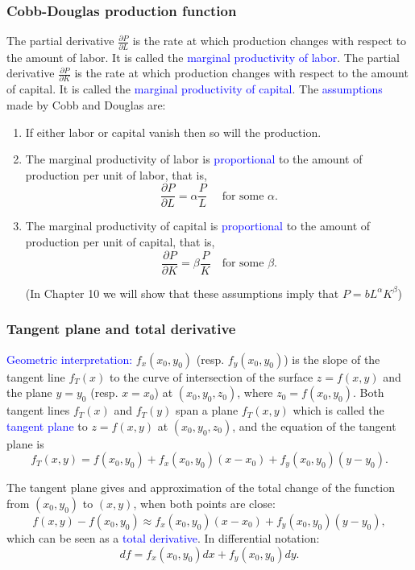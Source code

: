 \documentclass[11pt,aspectratio=169]{beamer}
\begin{document}
\begin{frame}
\frametitle{Cobb-Douglas production function}
\begin{small}
The partial derivative $\frac{\partial P}{\partial L}$ is the rate at  which production changes with respect to the amount of labor. It is called the \textcolor{blue}{marginal productivity of labor}.
 \vskip 10pt
 The partial derivative $\frac{\partial P}{\partial K}$ is the rate at  which production changes with respect to the amount of capital. It is called the \textcolor{blue}{marginal productivity of capital}.
 \vskip 10pt
 The \textcolor{blue}{assumptions}  made by Cobb and Douglas are:
 \begin{enumerate}
\item  If either labor or capital vanish then so will the  production.
\item The marginal productivity of labor is \textcolor{blue}{proportional} to the  amount  of production per unit of labor, that is,
$$
\frac{\partial P}{\partial L}=\alpha \frac{P}{L} \quad \text{ for some }  \alpha.
$$
\item The marginal productivity of capital is \textcolor{blue}{proportional} to the  amount  of production per unit of capital, that is,
$$
\frac{\partial P}{\partial K}=\beta \frac{P}{K}\quad \text{for some } \beta.
$$
\begin{tiny}(In Chapter 10 we will show that these assumptions imply that $P=b L^{\alpha} K^{\beta}$) \end{tiny}
 \end{enumerate}
 
\end{small}

\end{frame}

\begin{frame}
\frametitle{Tangent plane and total derivative}
\begin{small}
\textcolor{blue}{Geometric interpretation:} $f_x(x_0,y_0)$ (resp.   $f_y(x_0,y_0)$) is the slope of the tangent line $f_T(x)$ to the curve of intersection of the surface $z=f(x,y)$ and the plane $y=y_0$ (resp. $x=x_0$) at $(x_0,y_0,z_0)$, where $z_0=f(x_0, y_0)$.
\vskip 12pt
 Both tangent lines $f_T(x)$ and $f_T(y)$ span a plane $f_T(x,y)$ which is called the \textcolor{blue}{tangent plane} to $z=f(x,y)$ at $(x_0,y_0,z_0)$, and the equation of the tangent plane is
$$
f_T(x,y)=f(x_0,y_0)+f_x(x_0, y_0) (x-x_0) +f_y(x_0, y_0) (y-y_0).
$$

\vskip 12pt
 The tangent plane gives and approximation of the total change of the function from $(x_0, y_0)$ to $(x,y)$, when both points are close:
$$
f(x,y)-f(x_0,y_0)\approx f_x(x_0, y_0) (x-x_0) +f_y(x_0, y_0) (y-y_0),
$$
which can be seen as a \textcolor{blue}{total derivative}. In differential notation:
$$
df= f_x(x_0, y_0) dx +f_y(x_0, y_0) dy.
$$


\end{small}
\end{frame}
\end{document}
